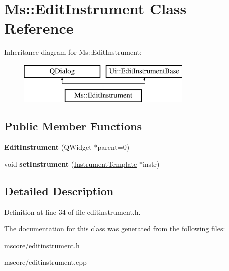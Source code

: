 \hypertarget{class_ms_1_1_edit_instrument}{}\section{Ms\+:\+:Edit\+Instrument Class Reference}
\label{class_ms_1_1_edit_instrument}
Inheritance diagram for Ms\+:\+:Edit\+Instrument\+:\begin{figure}[H]
\begin{center}
\leavevmode
\includegraphics[height=2.000000cm]{class_ms_1_1_edit_instrument}
\end{center}
\end{figure}
\subsection*{Public Member Functions}
\begin{DoxyCompactItemize}
\item 
\mbox{\label{class_ms_1_1_edit_instrument_aa3c257b92707d07155bd698f60322eba}} 
{\bfseries Edit\+Instrument} (Q\+Widget $\ast$parent=0)
\item 
\mbox{\label{class_ms_1_1_edit_instrument_a312d172b9cd835749629a166007adbb5}} 
void {\bfseries set\+Instrument} (\hyperlink{class_ms_1_1_instrument_template}{Instrument\+Template} $\ast$instr)
\end{DoxyCompactItemize}


\subsection{Detailed Description}


Definition at line 34 of file editinstrument.\+h.



The documentation for this class was generated from the following files\+:\begin{DoxyCompactItemize}
\item 
mscore/editinstrument.\+h\item 
mscore/editinstrument.\+cpp\end{DoxyCompactItemize}
